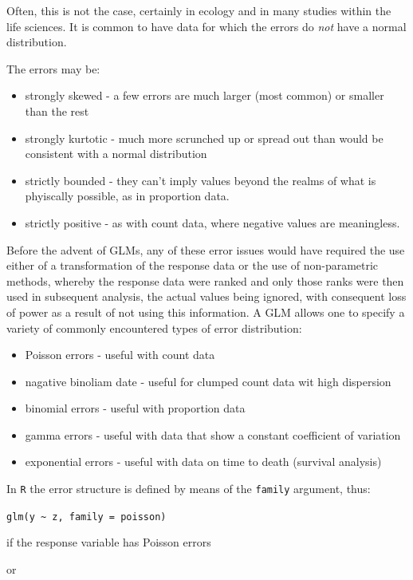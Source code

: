 \documentclass[
  letterpaper,
  DIV=11,
  numbers=noendperiod]{scrreprt}
\providecommand{\tightlist}{%
  \setlength{\itemsep}{0pt}\setlength{\parskip}{0pt}}\usepackage{longtable,booktabs,array}
\begin{document}
Often, this is not the case, certainly in ecology and in many studies
within the life sciences. It is common to have data for which the errors
do \emph{not} have a normal distribution.

The errors may be:

\begin{itemize}
\tightlist
\item
  strongly skewed - a few errors are much larger (most common) or
  smaller than the rest
\item
  strongly kurtotic - much more scrunched up or spread out than would be
  consistent with a normal distribution
\item
  strictly bounded - they can't imply values beyond the realms of what
  is phyiscally possible, as in proportion data.
\item
  strictly positive - as with count data, where negative values are
  meaningless.
\end{itemize}

Before the advent of GLMs, any of these error issues would have required
the use either of a transformation of the response data or the use of
non-parametric methods, whereby the response data were ranked and only
those ranks were then used in subsequent analysis, the actual values
being ignored, with consequent loss of power as a result of not using
this information. A GLM allows one to specify a variety of commonly
encountered types of error distribution:

\begin{itemize}
\tightlist
\item
  Poisson errors - useful with count data
\item
  nagative binoliam date - useful for clumped count data wit high
  dispersion
\item
  binomial errors - useful with proportion data
\item
  gamma errors - useful with data that show a constant coefficient of
  variation
\item
  exponential errors - useful with data on time to death (survival
  analysis)
\end{itemize}

In \texttt{R} the error structure is defined by means of the
\texttt{family} argument, thus:

\texttt{glm(y\ \textasciitilde{}\ z,\ family\ =\ poisson)}

if the response variable has Poisson errors

or
\end{document}
